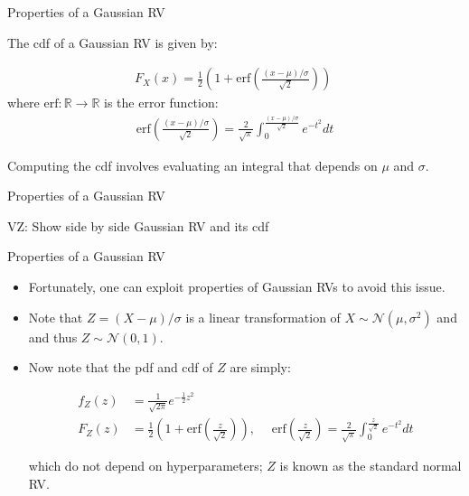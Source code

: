 \documentclass[9pt]{beamer}
\begin{document}
%
\begin{frame}{Properties of a Gaussian RV}

The cdf of a Gaussian RV is given by:
\begin{block}{}
\begin{align*}
F_X(x)=\frac{1}{2}\left(1+\textrm{erf}\left(\frac{(x-\mu)/\sigma}{\sqrt{2}}\right)\right)\; 
\end{align*}
where $\textrm{erf}:\mathbb{R}\to \mathbb{R}$ is the error function:
\begin{align*}
\textrm{erf}\left(\frac{(x-\mu)/\sigma}{\sqrt{2}}\right)=\frac{2}{\sqrt{\pi}}\int_0^{\frac{(x-\mu)/\sigma}{\sqrt{2}}}e^{-t^2}dt
\end{align*}
\end{block}
Computing the cdf involves evaluating an integral that depends on $\mu$ and $\sigma$. 

\end{frame}

%
\begin{frame}{Properties of a Gaussian RV}
\begin{block}{}
{\color{red} VZ: Show side by side Gaussian RV and its cdf}
\end{block}
\end{frame}

%
\begin{frame}{Properties of a Gaussian RV}

\begin{itemize}
\item Fortunately, one can exploit properties of Gaussian RVs to avoid this issue. 

\item Note that $Z=(X-\mu)/\sigma$ is a linear transformation of $X\sim \mathcal{N}(\mu,\sigma^2)$ and and thus $Z\sim \mathcal{N}(0,1)$. 

\item Now note that the pdf and cdf of $Z$ are simply:
\begin{block}{}
\begin{align*}
f_Z(z)&=\frac{1}{\sqrt{2\pi}}e^{-\frac{1}{2}z^2}\\
F_Z\left(z\right)&=\frac{1}{2}\left(1+\textrm{erf}\left(\frac{z}{\sqrt{2}}\right)\right),\; \quad \textrm{erf}\left(\frac{z}{\sqrt{2}}\right)=\frac{2}{\sqrt{\pi}}\int_0^{\frac{z}{\sqrt{2}}}e^{-t^2}dt
\end{align*}
\end{block}
which do not depend on hyperparameters; $Z$ is known as the standard normal RV. 
\end{itemize}

\end{frame}
\end{document}
